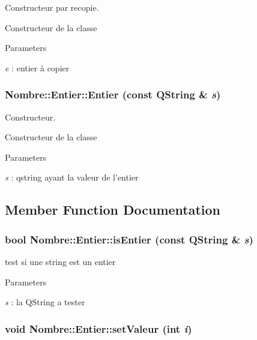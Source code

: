 Constructeur par recopie. 

Constructeur de la classe


\begin{DoxyParams}{Parameters}
\item[{\em e}]: entier à copier \end{DoxyParams}
\hypertarget{classNombre_1_1Entier_ae18e68f53e56a1ed8e951cb43b7b34d1}{
\subsubsection[{Entier}]{\setlength{\rightskip}{0pt plus 5cm}Nombre::Entier::Entier (const QString \& {\em s})}}
\label{classNombre_1_1Entier_ae18e68f53e56a1ed8e951cb43b7b34d1}


Constructeur. 

Constructeur de la classe


\begin{DoxyParams}{Parameters}
\item[{\em s}]: qstring ayant la valeur de l'entier \end{DoxyParams}


\subsection{Member Function Documentation}
\hypertarget{classNombre_1_1Entier_a3460b04b6428c23fef45c4d6e204ea80}{
\subsubsection[{isEntier}]{\setlength{\rightskip}{0pt plus 5cm}bool Nombre::Entier::isEntier (const QString \& {\em s})}}
\label{classNombre_1_1Entier_a3460b04b6428c23fef45c4d6e204ea80}


test si une string est un entier 


\begin{DoxyParams}{Parameters}
\item[{\em s}]: la QString a tester \end{DoxyParams}
\hypertarget{classNombre_1_1Entier_a434f40deb776ef9f128629095d130bf2}{
\subsubsection[{setValeur}]{\setlength{\rightskip}{0pt plus 5cm}void Nombre::Entier::setValeur (int {\em i})}}
\label{classNombre_1_1Entier_a434f40deb776ef9f128629095d130bf2}


